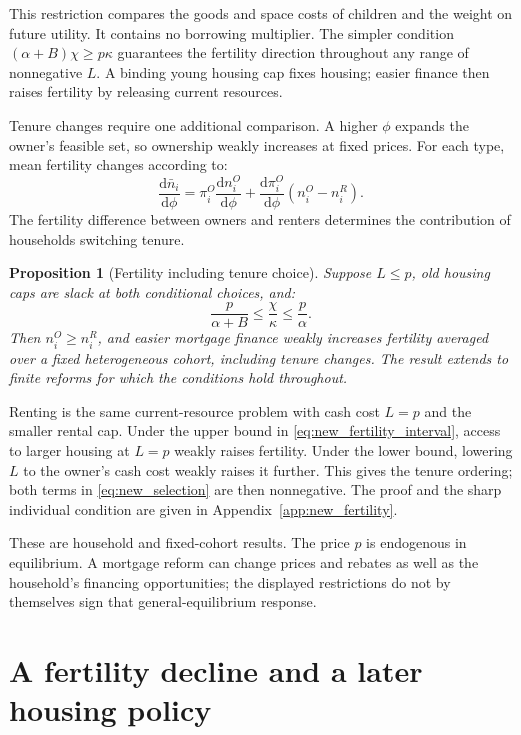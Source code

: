 \documentclass[11pt]{article}
\newtheorem{proposition}{Proposition}
\newcommand{\dd}{\mathrm d}
\begin{document}
This restriction compares the goods and space costs of children and the
weight on future utility. It contains no borrowing multiplier. The simpler
condition $(\alpha+B)\chi\ge p\kappa$ guarantees the fertility direction
throughout any range of nonnegative $L$. A binding young housing cap fixes
housing; easier finance then raises fertility by releasing current resources.

Tenure changes require one additional comparison. A higher $\phi$ expands
the owner's feasible set, so ownership weakly increases at fixed prices. For
each type, mean fertility changes according to:
\begin{equation}
\frac{\dd\bar n_i}{\dd\phi}
=\pi_i^O\frac{\dd n_i^O}{\dd\phi}
 +\frac{\dd\pi_i^O}{\dd\phi}(n_i^O-n_i^R).
\label{eq:new_selection}
\end{equation}
The fertility difference between owners and renters determines the contribution
of households switching tenure.

\begin{proposition}[Fertility including tenure choice]
Suppose $L\le p$, old housing caps are slack at both conditional choices, and:
\begin{equation}
\frac p{\alpha+B}\le\frac\chi\kappa\le\frac p\alpha.
\label{eq:new_fertility_interval}
\end{equation}
Then $n_i^O\ge n_i^R$, and easier mortgage finance weakly increases fertility
averaged over a fixed heterogeneous cohort, including tenure changes. The
result extends to finite reforms for which the conditions hold throughout.
\end{proposition}

Renting is the same current-resource problem with cash cost $L=p$ and the
smaller rental cap. Under the upper bound in
\eqref{eq:new_fertility_interval}, access to larger housing at $L=p$ weakly
raises fertility. Under the lower bound, lowering $L$ to the owner's cash
cost weakly raises it further. This gives the tenure ordering; both terms in
\eqref{eq:new_selection} are then nonnegative. The proof and the sharp
individual condition are given in Appendix~\ref{app:new_fertility}.

These are household and fixed-cohort results. The price $p$ is endogenous in
equilibrium. A mortgage reform can change prices and rebates as well as the
household's financing opportunities; the displayed restrictions do not by
themselves sign that general-equilibrium response.

\section{A fertility decline and a later housing policy}
\end{document}
